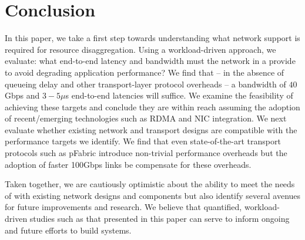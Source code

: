 \section{Conclusion}
In this paper, we take a first step towards understanding what network support is required for resource disaggregation. Using a workload-driven approach, we evaluate: what end-to-end latency and bandwidth must the network in a \dis provide to avoid degrading application performance? We find that -- in the absence of queueing delay and other transport-layer protocol overheads -- a bandwidth of $40$Gbps and $3-5\mu$s end-to-end latencies will suffice. We examine the feasibility of achieving these targets and conclude they are within reach assuming the adoption of recent/emerging technologies such as RDMA and NIC integration. We next evaluate whether existing network and transport designs are compatible with the performance targets we identify. We find that even state-of-the-art transport protocols such as pFabric introduce non-trivial performance overheads but the adoption of faster 100Gbps links be compensate for these overheads.

Taken together, we are cautiously optimistic about the ability to meet the needs of \dis with existing network designs and components but also identify several avenues for future improvements and research. We believe that quantified, workload-driven studies such as that presented in this paper can serve to inform ongoing and future efforts to build \dis systems. 

